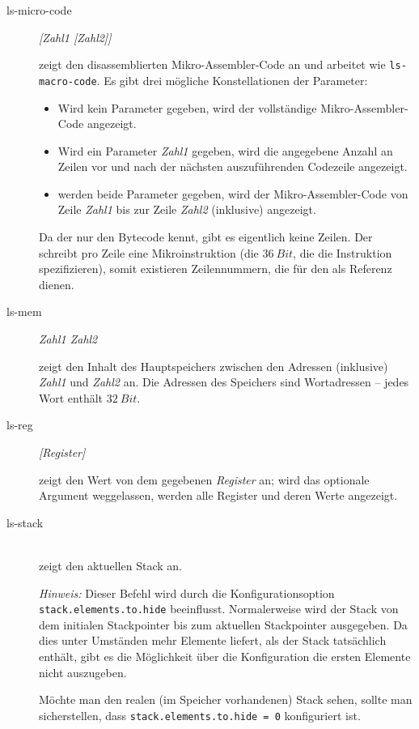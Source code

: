 \begin{description}
\item[ls-micro-code] \emph{[Zahl1 [Zahl2]]}

  zeigt den disassemblierten Mikro-Assembler-Code an und arbeitet wie \texttt{ls-macro-code}. Es gibt drei mögliche Konstellationen der Parameter:
  \begin{itemize}
  \item Wird kein Parameter gegeben, wird der vollständige Mikro-Assembler-Code angezeigt.
  \item Wird ein Parameter \emph{Zahl1} gegeben, wird die angegebene Anzahl an Zeilen vor und nach der nächsten auszuführenden Codezeile angezeigt.
  \item werden beide Parameter gegeben, wird der Mikro-Assembler-Code von Zeile \emph{Zahl1} bis zur Zeile \emph{Zahl2} (inklusive) angezeigt.
  \end{itemize}

  Da der \md nur den Bytecode kennt, gibt es eigentlich keine Zeilen. Der \md schreibt pro Zeile eine Mikroinstruktion (die $36~Bit$, die die Instruktion spezifizieren), somit existieren Zeilennummern, die für den \md als Referenz dienen.

\item[ls-mem] \emph{Zahl1 Zahl2}

  zeigt den Inhalt des Hauptspeichers zwischen den Adressen (inklusive) \emph{Zahl1} und \emph{Zahl2} an. Die Adressen des Speichers sind Wortadressen -- jedes Wort enthält $32~Bit$.

\item[ls-reg] \emph{[Register]}

  zeigt den Wert von dem gegebenen \emph{Register} an; wird das optionale Argument weggelassen, werden alle Register und deren Werte angezeigt.

\item[ls-stack] \hspace*{\fill}\\

  zeigt den aktuellen Stack an.

  \emph{Hinweis:} Dieser Befehl wird durch die Konfigurationsoption \texttt{stack.elements.to.hide} beeinflusst. Normalerweise wird der Stack von dem initialen Stackpointer bis zum aktuellen Stackpointer ausgegeben. Da dies unter Umständen mehr Elemente liefert, als der Stack tatsächlich enthält, gibt es die Möglichkeit über die Konfiguration die ersten Elemente nicht auszugeben.

Möchte man den realen (im Speicher vorhandenen) Stack sehen, sollte man sicherstellen, dass \texttt{stack.elements.to.hide = 0} konfiguriert ist.


\end{description}
